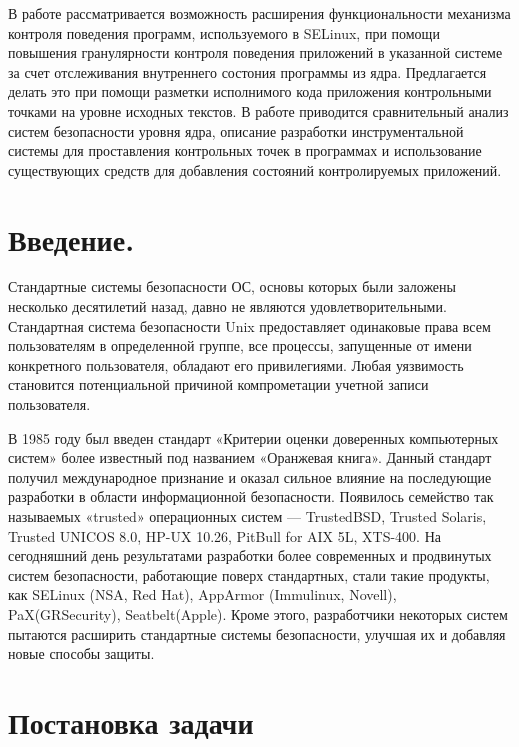 {} 

{\large В работе рассматривается возможность расширения функциональности 
механизма контроля поведения программ, используемого в SELinux, при 
помощи повышения гранулярности контроля поведения приложений
в указанной системе за счет отслеживания внутреннего состония
программы из ядра. Предлагается делать это при помощи
разметки исполнимого кода приложения контрольными точками 
на уровне исходных текстов. В работе приводится сравнительный 
анализ систем безопасности уровня ядра, описание разработки 
инструментальной системы для проставления контрольных точек 
в программах и использование существующих средств для добавления
состояний контролируемых приложений. 
}

\newpage
\tableofcontents
\newpage

\bigskip 
\section{Введение.}

Стандартные системы безопасности ОС, основы которых 
были заложены несколько десятилетий назад, давно не 
являются удовлетворительными. Стандартная система 
безопасности Unix предоставляет одинаковые права всем 
пользователям в определенной группе, все процессы, 
запущенные от имени конкретного пользователя, обладают 
его привилегиями. Любая уязвимость становится 
потенциальной причиной компрометации учетной записи 
пользователя. 

В 1985 году был введен стандарт «Критерии 
оценки доверенных компьютерных систем» более известный 
под названием «Оранжевая книга». Данный стандарт получил 
международное признание и оказал сильное влияние на 
последующие разработки в области информационной безопасности. 
Появилось семейство так называемых «trusted» операционных 
систем — TrustedBSD, Trusted Solaris, Trusted UNICOS 8.0, 
HP-UX 10.26, PitBull for AIX 5L, XTS-400. На сегодняшний 
день результатами разработки 
более современных и продвинутых систем безопасности, 
работающие поверх стандартных, стали такие продукты, как 
SELinux (NSA, Red Hat), AppArmor (Immulinux, Novell), 
PaX(GRSecurity), Seatbelt(Apple). Кроме этого, разработчики 
некоторых систем пытаются расширить стандартные системы 
безопасности, улучшая их и добавляя новые способы защиты.
 


\section{Постановка задачи}
